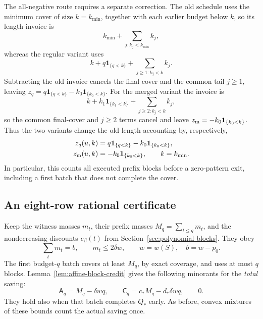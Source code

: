 The all-negative route requires a separate correction. The old
schedule uses the minimum cover of size $k=k_{\min}$, together with
each earlier budget below $k$, so its length invoice is
\[
 k_{\min}+\sum_{j:k_j<k_{\min}}k_j,
\]
whereas the regular variant uses
\[
 k+q\mathbf1_{\{q<k\}}+\sum_{j\ge1:k_j<k}k_j.
\]
Subtracting the old invoice cancels the final cover and the common
tail $j\ge1$, leaving $z_q=q\mathbf1_{\{q<k\}}-k_0\mathbf1_{\{k_0<k\}}$.
For the merged variant the invoice is
\[
 k+k_1\mathbf1_{\{k_1<k\}}+\sum_{j\ge2:k_j<k}k_j,
\]
so the common final-cover and $j\ge2$ terms cancel and leave
$z_{\rm m}=-k_0\mathbf1_{\{k_0<k\}}$. Thus the two variants
change the old length accounting by, respectively,
\begin{equation}\label{eq:first-phase-zero-correction}
 \begin{aligned}
 z_q(u,k)&=q\mathbf1_{\{q<k\}}-k_0\mathbf1_{\{k_0<k\}},\\
 z_{\rm m}(u,k)&=-k_0\mathbf1_{\{k_0<k\}},
 \qquad k=k_{\min}.
 \end{aligned}
\end{equation}
In particular, this counts all executed prefix blocks before a
zero-pattern exit, including a first batch that does not complete
the cover.

\subsection{An eight-row rational certificate}

Keep the witness masses $m_t$, their prefix masses
$M_q=\sum_{t\le q}m_t$, and the nondecreasing discounts $e_\beta(t)$
from Section~\ref{sec:polynomial-blocks}. They obey
\[
 \sum_t m_t=b,\qquad m_t\le2\delta w,
 \qquad w=w(S),\quad b=w-p_0.
\]
The first budget-$q$ batch covers at least $M_q$, by exact coverage,
and uses at most $q$ blocks. Lemma~\ref{lem:affine-block-credit} gives
the following minorants for the \emph{total} saving:
\[
 \mathsf A_q=M_q-\delta wq,\qquad
 \mathsf C_q=c_*M_q-d_*\delta wq,\qquad 0.
\]
They hold also when that batch completes $Q_*$ early. As before,
convex mixtures of these bounds count the actual saving once.

